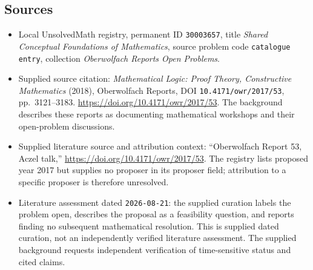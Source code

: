 \documentclass[11pt]{article}
\begin{document}
\subsection{Sources}
\begin{itemize}
\item Local UnsolvedMath registry, permanent ID \texttt{30003657}, title \emph{Shared Conceptual Foundations of Mathematics}, source problem code \texttt{catalogue entry}, collection \emph{Oberwolfach Reports Open Problems}.
\item Supplied source citation: \emph{Mathematical Logic: Proof Theory, Constructive Mathematics} (2018), Oberwolfach Reports, DOI \texttt{10.4171/owr/2017/53}, pp.~3121--3183. \url{https://doi.org/10.4171/owr/2017/53}. The background describes these reports as documenting mathematical workshops and their open-problem discussions.
\item Supplied literature source and attribution context: ``Oberwolfach Report 53, Aczel talk,'' \url{https://doi.org/10.4171/owr/2017/53}. The registry lists proposed year 2017 but supplies no proposer in its proposer field; attribution to a specific proposer is therefore unresolved.
\item Literature assessment dated \texttt{2026-08-21}: the supplied curation labels the problem open, describes the proposal as a feasibility question, and reports finding no subsequent mathematical resolution. This is supplied dated curation, not an independently verified literature assessment. The supplied background requests independent verification of time-sensitive status and cited claims.
\end{itemize}
\end{document}
